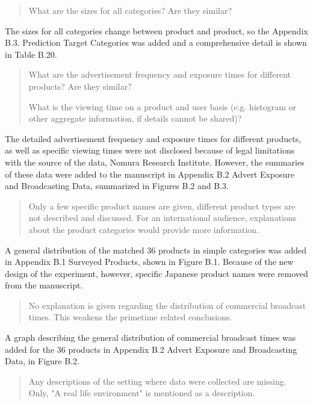 \documentclass[review]{elsarticle}
\begin{document}
\begin{quotation}
What are the sizes for all categories? Are they similar?
\end{quotation}

The sizes for all categories change between product and product, so the Appendix B.3. Prediction Target Categories was added and a comprehensive detail is shown in Table B.20.

\begin{quotation}
What are the advertisement frequency and exposure times for different products? Are they similar?

What is the viewing time on a product and user basis (e.g. histogram or other aggregate information, if details cannot be shared)?
\end{quotation}

The detailed advertisement frequency and exposure times for different products, as well as specific viewing times were not disclosed because of legal limitations with the source of the data, Nomura Research Institute. However, the summaries of these data were added to the manuscript in Appendix B.2 Advert Exposure and Broadcasting Data, summarized in Figures B.2 and B.3.


\begin{quotation}
Only a few specific product names are given, different product types are not described and discussed. For an international audience, explanations about the product categories would provide more information. 
\end{quotation}

A general distribution of the matched 36 products in simple categories was added in Appendix B.1 Surveyed Products, shown in Figure B.1. Because of the new design of the experiment, however, specific Japanese product names were removed from the manuscript.

\begin{quotation}
No explanation is given regarding the distribution of commercial broadcast times. This weakens the primetime related conclusions.
\end{quotation}

A graph describing the general distribution of commercial broadcast times was added for the 36 products in Appendix B.2 Advert Exposure and Broadcasting Data, in Figure B.2.

\begin{quotation}
Any descriptions of the setting where data were collected are missing. Only, "A real life environment" is mentioned as a description.
\end{quotation}
\end{document}
